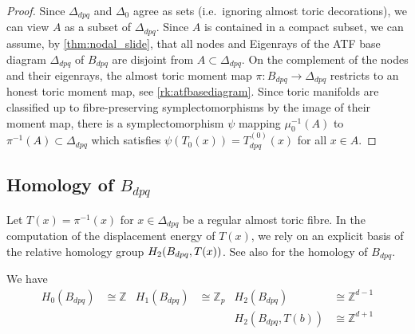 \documentclass[12pt,a4paper,draft]{scrartcl}
\begin{document}
\begin{proof}
    Since $\Delta_{dpq}$ and $\Delta_0$ agree as sets (i.e.\ ignoring almost toric decorations), we can view $A$ as a subset of $\Delta_{dpq}$. Since $A$ is contained in a compact subset, we can assume, by \cref{thm:nodal_slide}, that all nodes and Eigenrays of the ATF base diagram $\Delta_{dpq}$ of $B_{dpq}$ are disjoint from $A \subset \Delta_{dpq}$. On the complement of the nodes and their eigenrays, the almost toric moment map $\pi \colon B_{dpq} \rightarrow \Delta_{dpq}$ restricts to an honest toric moment map, see \cref{rk:atfbasediagram}. Since toric manifolds are classified up to fibre-preserving symplectomorphisms by the image of their moment map, there is a symplectomorphism $\psi$ mapping $\mu_0^{-1}(A)$ to $\pi^{-1}(A) \subset \Delta_{dpq}$ which satisfies $\psi(T_0(x)) = T_{dpq}^{(0)}(x)$ for all $x \in A$.
\end{proof}



\subsection{Homology of \texorpdfstring{$B_{dpq}$}{Bdpq}}
\label{sec:homology}

Let $T(x) = π^{-1}(x)$ for $x ∈ Δ_{dpq}$ be a regular almost toric fibre. In the computation of the displacement energy of $T(x)$, we rely on an explicit basis of the relative homology group $H_2\qty(B_{dpq},T(x))$.
See also \cite[Lemma 7.11]{evans2021atfs} for the homology of $B_{dpq}$.

\begin{lemma}
  \label{thm:homology}
  We have
  \begin{align*}
    H_0(B_{dpq}) &≅ ℤ & H_1(B_{dpq}) &≅ ℤ_p & H_2(B_{dpq}) &≅ ℤ^{d-1} \\
                 &    &              &      & H_2(B_{dpq},T(b)) &≅ ℤ^{d+1}
  \end{align*}
\end{lemma}
\end{document}
